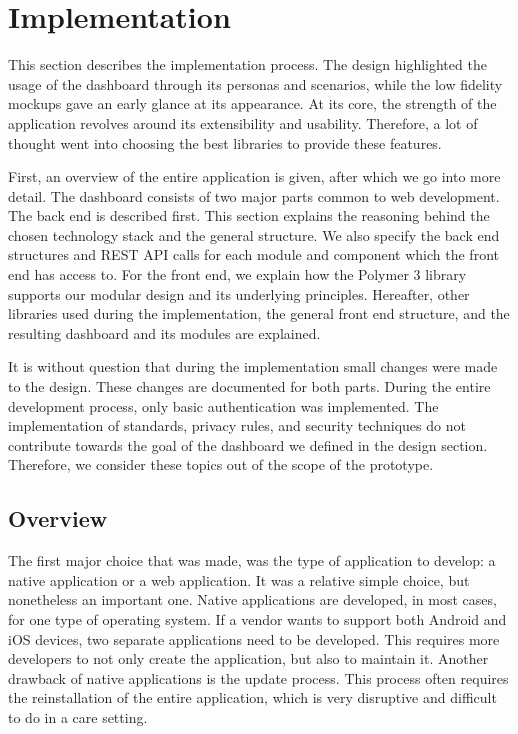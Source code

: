 
\section{Implementation}\label{implementation}

This section describes the implementation process. The design highlighted the usage of the dashboard through its personas and scenarios, while the low fidelity mockups gave an early glance at its appearance. At its core, the strength of the application revolves around its extensibility and usability. Therefore, a lot of thought went into choosing the best libraries to provide these features.

First, an overview of the entire application is given, after which we go into more detail. The dashboard consists of two major parts common to web development. The back end is described first. This section explains the reasoning behind the chosen technology stack and the general structure. We also specify the back end structures and REST API calls for each module and component which the front end has access to. For the front end, we explain how the Polymer 3 library supports our modular design and its underlying principles. Hereafter, other libraries used during the implementation, the general front end structure, and the resulting dashboard and its modules are explained. 

It is without question that during the implementation small changes were made to the design. These changes are documented for both parts. During the entire development process, only basic authentication was implemented. The implementation of standards, privacy rules, and security techniques do not contribute towards the goal of the dashboard we defined in the design section. Therefore, we consider these topics out of the scope of the prototype.

    \subsection{Overview}\label{implementation_overview}

    The first major choice that was made, was the type of application to develop: a native application or a web application. It was a relative simple choice, but nonetheless an important one. Native applications are developed, in most cases, for one type of operating system. If a vendor wants to support both Android and iOS devices, two separate applications need to be developed. This requires more developers to not only create the application, but also to maintain it. Another drawback of native applications is the update process. This process often requires the reinstallation of the entire application, which is very disruptive and difficult to do in a care setting.

